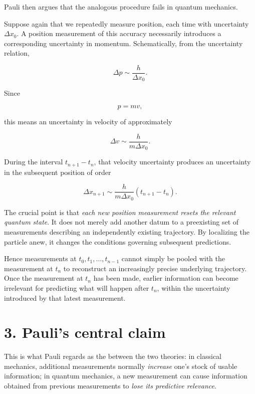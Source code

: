 Pauli then argues that the analogous procedure fails in quantum mechanics.

Suppose again that we repeatedly measure position, each time with uncertainty $\Delta x_0$. A position measurement of this accuracy necessarily introduces a corresponding uncertainty in momentum. Schematically, from the uncertainty relation,

\begin{equation*}
\Delta p \sim \frac{h}{\Delta x_0}.
\end{equation*}

Since

\begin{equation*}
p=mv,
\end{equation*}

this means an uncertainty in velocity of approximately

\begin{equation*}
\Delta v\sim\frac{h}{m\Delta x_0}.
\end{equation*}

During the interval $t_{n+1}-t_n$, that velocity uncertainty produces an uncertainty in the subsequent position of order

\begin{equation*}
\Delta x_{n+1}
\sim
\frac{h}{m\Delta x_0}(t_{n+1}-t_n).
\end{equation*}

The crucial point is that \emph{each new position measurement resets the relevant quantum state}. It does not merely add another datum to a preexisting set of measurements describing an independently existing trajectory. By localizing the particle anew, it changes the conditions governing subsequent predictions.

Hence measurements at $t_0,t_1,\ldots,t_{n-1}$ cannot simply be pooled with the measurement at $t_n$ to reconstruct an increasingly precise underlying trajectory. Once the measurement at $t_n$ has been made, earlier information can become irrelevant for predicting what will happen after $t_n$, within the uncertainty introduced by that latest measurement.

\section*{3. Pauli's central claim}

This is what Pauli regards as the  between the two theories: in classical mechanics, additional measurements normally \emph{increase} one's stock of usable information; in quantum mechanics, a new measurement can cause information obtained from previous measurements to \emph{lose its predictive relevance}.

